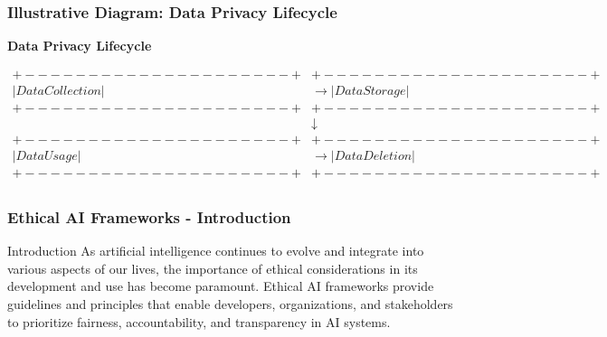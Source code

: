 \documentclass[aspectratio=169]{beamer}
\begin{document}
\begin{frame}[fragile]
    \frametitle{Illustrative Diagram: Data Privacy Lifecycle}
    \begin{center}
        \textbf{Data Privacy Lifecycle}
        \begin{minipage}{0.8\linewidth}
            \begin{align*}
                +---------------------+ &   +---------------------+ \\
                |   Data Collection   | & \rightarrow |     Data Storage    | \\
                +---------------------+ &   +---------------------+ \\
                &   \downarrow \\
                +---------------------+ &   +---------------------+ \\
                |    Data Usage       | & \rightarrow |     Data Deletion   | \\
                +---------------------+ &   +---------------------+ \\
            \end{align*}
        \end{minipage}
    \end{center}
\end{frame}

\begin{frame}[fragile]
    \frametitle{Ethical AI Frameworks - Introduction}
    \begin{block}{Introduction}
        As artificial intelligence continues to evolve and integrate into various aspects of our lives, the importance of ethical considerations in its development and use has become paramount. 
        Ethical AI frameworks provide guidelines and principles that enable developers, organizations, and stakeholders to prioritize fairness, accountability, and transparency in AI systems.
    \end{block}
\end{frame}
\end{document}
